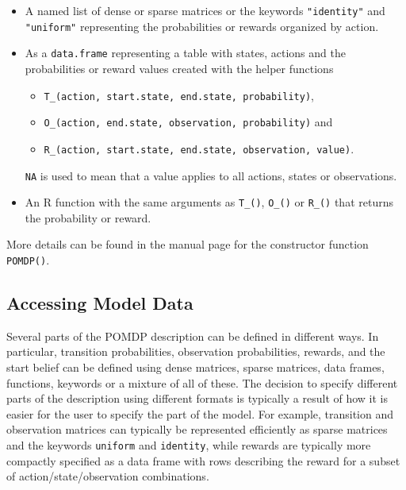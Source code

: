 \begin{itemize}
\item
  A named list of dense or sparse matrices or the keywords \texttt{"identity"} and \texttt{"uniform"} representing the
  probabilities or rewards organized by action.
\item
  As a \texttt{data.frame} representing a table with states, actions and the probabilities or reward values created with the helper functions

  \begin{itemize}
  \tightlist
  \item
    \texttt{T\_(action,\ start.state,\ end.state,\ probability)},
  \item
    \texttt{O\_(action,\ end.state,\ observation,\ probability)} and
  \item
    \texttt{R\_(action,\ start.state,\ end.state,\ observation,\ value)}.
  \end{itemize}

  \texttt{NA} is used to mean that a value applies to all actions, states or observations.
\item
  An R function with the same arguments as \texttt{T\_()}, \texttt{O\_()} or \texttt{R\_()} that
  returns the probability or reward.
\end{itemize}

More details can be found in the manual page for the constructor function \texttt{POMDP()}.

\subsection{Accessing Model Data}\label{accessing-model-data}

Several parts of the POMDP description can be defined in different ways. In particular, transition probabilities, observation
probabilities, rewards, and the start belief can be defined using dense matrices, sparse matrices, data frames, functions, keywords or a mixture of all of these. The decision to specify different parts of the description using different formats is
typically a result of how it is easier for the user to specify the part of the model.
For example, transition and observation matrices can typically be represented efficiently as sparse matrices and the keywords \texttt{uniform} and \texttt{identity}, while rewards are typically more compactly specified as a data frame with rows describing the reward for
a subset of action/state/observation combinations.

